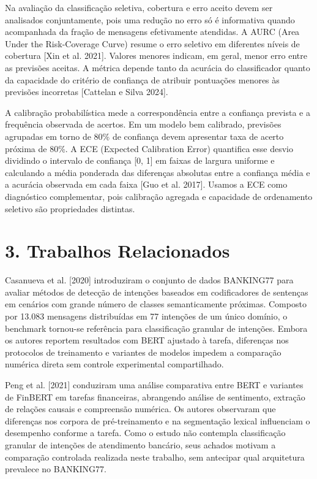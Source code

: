 \documentclass[12pt,a4paper]{article}
\begin{document}
Na avaliação da classificação seletiva, cobertura e erro aceito devem ser analisados conjuntamente, pois uma redução no erro só é informativa quando acompanhada da fração de mensagens efetivamente atendidas. A AURC (Area Under the Risk-Coverage Curve) resume o erro seletivo em diferentes níveis de cobertura [Xin et al. 2021]. Valores menores indicam, em geral, menor erro entre as previsões aceitas. A métrica depende tanto da acurácia do classificador quanto da capacidade do critério de confiança de atribuir pontuações menores às previsões incorretas [Cattelan e Silva 2024].

A calibração probabilística mede a correspondência entre a confiança prevista e a frequência observada de acertos. Em um modelo bem calibrado, previsões agrupadas em torno de 80\% de confiança devem apresentar taxa de acerto próxima de 80\%. A ECE (Expected Calibration Error) quantifica esse desvio dividindo o intervalo de confiança [0, 1] em faixas de largura uniforme e calculando a média ponderada das diferenças absolutas entre a confiança média e a acurácia observada em cada faixa [Guo et al. 2017]. Usamos a ECE como diagnóstico complementar, pois calibração agregada e capacidade de ordenamento seletivo são propriedades distintas.

\section*{\textbf{3. Trabalhos Relacionados}}

Casanueva et al. [2020] introduziram o conjunto de dados BANKING77 para avaliar métodos de detecção de intenções baseados em codificadores de sentenças em cenários com grande número de classes semanticamente próximas. Composto por 13.083 mensagens distribuídas em 77 intenções de um único domínio, o benchmark tornou-se referência para classificação granular de intenções. Embora os autores reportem resultados com BERT ajustado à tarefa, diferenças nos protocolos de treinamento e variantes de modelos impedem a comparação numérica direta sem controle experimental compartilhado.

Peng et al. [2021] conduziram uma análise comparativa entre BERT e variantes de FinBERT em tarefas financeiras, abrangendo análise de sentimento, extração de relações causais e compreensão numérica. Os autores observaram que diferenças nos corpora de pré-treinamento e na segmentação lexical influenciam o desempenho conforme a tarefa. Como o estudo não contempla classificação granular de intenções de atendimento bancário, seus achados motivam a comparação controlada realizada neste trabalho, sem antecipar qual arquitetura prevalece no BANKING77.
\end{document}
